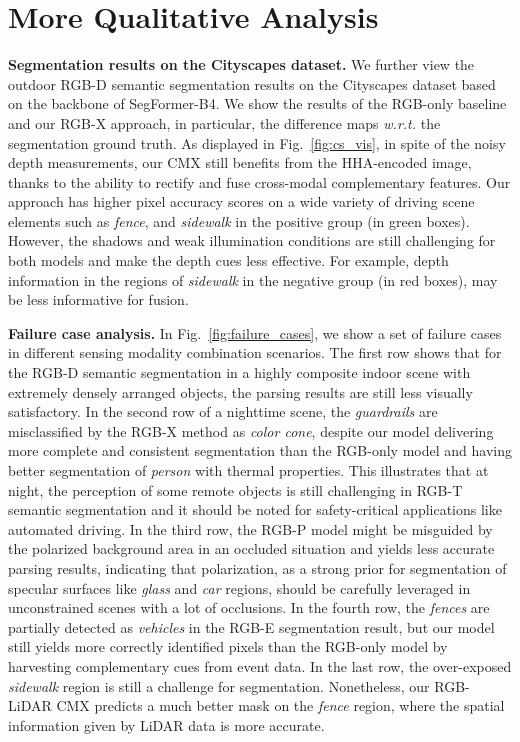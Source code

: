 \documentclass[journal]{IEEEtran}
\begin{document}
\section{More Qualitative Analysis}
\label{sec:failure_case}

\noindent\textbf{Segmentation results on the Cityscapes dataset.}
We further view the outdoor RGB-D semantic segmentation results on the Cityscapes dataset based on the backbone of SegFormer-B4.
We show the results of the RGB-only baseline and our RGB-X approach, in particular, the difference maps \textit{w.r.t.} the segmentation ground truth.
As displayed in Fig.~\ref{fig:cs_vis}, in spite of the noisy depth measurements, our CMX still benefits from the HHA-encoded image, thanks to the ability to rectify and fuse cross-modal complementary features.
Our approach has higher pixel accuracy scores on a wide variety of driving scene elements such as \emph{fence}, and \emph{sidewalk} in the positive group (in green boxes).
However, the shadows and weak illumination conditions are still challenging for both models and make the depth cues less effective. For example, depth information in the regions of \emph{sidewalk} in the negative group (in red boxes), may be less informative for fusion.

\noindent\textbf{Failure case analysis.}
In Fig.~\ref{fig:failure_cases}, we show a set of failure cases in different sensing modality combination scenarios.
The first row shows that for the RGB-D semantic segmentation in a highly composite indoor scene with extremely densely arranged objects, the parsing results are still less visually satisfactory.
In the second row of a nighttime scene, the \emph{guardrails} are misclassified by the RGB-X method as \emph{color cone}, despite our model delivering more complete and consistent segmentation than the RGB-only model and having better segmentation of \emph{person} with thermal properties.
This illustrates that at night, the perception of some remote objects is still challenging in RGB-T semantic segmentation and it should be noted for safety-critical applications like automated driving.
In the third row, the RGB-P model might be misguided by the polarized background area in an occluded situation and yields less accurate parsing results, indicating that polarization, as a strong prior for segmentation of specular surfaces like \emph{glass} and \emph{car} regions, should be carefully leveraged in unconstrained scenes with a lot of occlusions.
In the fourth row, the \emph{fences} are partially detected as \emph{vehicles} in the RGB-E segmentation result, but our model still yields more correctly identified pixels than the RGB-only model by harvesting complementary cues from event data. In the last row, the over-exposed \emph{sidewalk} region is still a challenge for segmentation. Nonetheless, our RGB-LiDAR CMX predicts a much better mask on the \emph{fence} region, where the spatial information given by LiDAR data is more accurate.
\end{document}

